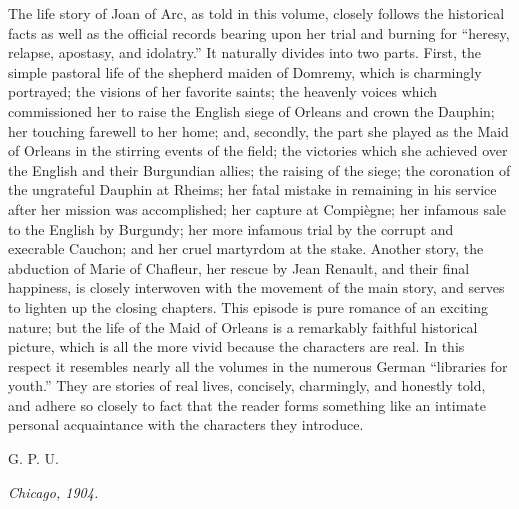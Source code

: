 \setcounter{fopagecnt}{2}

\drop The life story of Joan of Arc, as told in this volume, closely
follows the historical facts as well as the official records bearing
upon her trial and burning for ``heresy, relapse, apostasy, and
idolatry.'' It naturally divides into two parts. First, the simple
pastoral life of the shepherd maiden of Domremy, which is charmingly
portrayed; the visions of her favorite saints; the heavenly voices which
commissioned her to raise the English siege of Orleans and crown the
Dauphin; her touching farewell to her home; and, secondly, the part she
played as the Maid of Orleans in the stirring events of the field; the
victories which she achieved over the English and their Burgundian
allies; the raising of the siege; the coronation of the ungrateful
Dauphin at Rheims; her fatal mistake in remaining in his service after
her mission was accomplished; her capture at Compiègne; her infamous
sale to the English by Burgundy; her more infamous trial by the corrupt
and execrable Cauchon; and her cruel martyrdom at the stake. Another
story, the abduction of Marie of Chafleur, her rescue by Jean Renault,
and their final happiness, is closely interwoven with the movement of
the main story, and serves to lighten up the closing chapters. This
episode is pure romance of an exciting nature; but the life of the Maid
of Orleans is a remarkably faithful historical picture, which is all the
more vivid because the characters are real. In this respect it resembles
nearly all the volumes in the numerous German ``libraries for youth.''
They are stories of real lives, concisely, charmingly, and honestly
told, and adhere so closely to fact that the reader forms something like
an intimate personal acquaintance with the characters they introduce.

\begin{flushright}
\textsc{G. P. U.}
\end{flushright}

\begin{flushright}
\textit{Chicago, 1904.}
\end{flushright}
